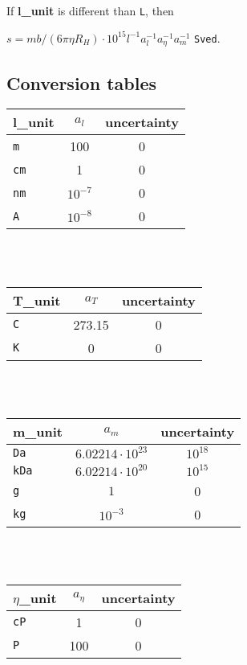 \documentclass[12pt,letterpaper]{article}
\begin{document}
If \textbf{l\_unit} is different than \texttt{L}, then \\
\begin{center}
$s = mb/(6\pi\eta R_H) \cdot 10^{15} l^{-1} a_l^{-1} a_\eta^{-1} a_m^{-1}$ \texttt{Sved}.
\end{center} 

\subsection{Conversion tables}

\begin{tabular}{| l | c | c |}
\hline \textbf{l\_unit} & $a_{l}$ & uncertainty \\
\hline\hline \texttt{m} & 100 & 0 \\
\hline\texttt{cm} & 1 & 0 \\
\hline\texttt{nm} & $10^{-7}$ & 0 \\
\hline\texttt{A} & $10^{-8}$ & 0 \\
\hline
\end{tabular} \\ \\

\noindent \begin{tabular}{| l | c | c |}
\hline \textbf{T\_unit} & $a_{T}$ & uncertainty \\
\hline\hline \texttt{C} & 273.15 & 0 \\
\hline \texttt{K} & 0 & 0 \\
\hline
\end{tabular} \\ \\

\noindent \begin{tabular}{| l | c | c |}
\hline \textbf{m\_unit} & $a_{m}$ & uncertainty \\
\hline\hline \texttt{Da} & $6.02214 \cdot 10^{23}$ & $10^{18}$ \\
\hline \texttt{kDa} & $6.02214 \cdot 10^{20}$ & $10^{15}$ \\
\hline \texttt{g} & $1$ & 0 \\
\hline \texttt{kg} & $10^{-3}$ & 0 \\
\hline
\end{tabular} \\ \\

\noindent \begin{tabular}{| l | c | c |}
\hline $\eta$\textbf{\_unit} & $a_{\eta}$ & uncertainty \\
\hline\hline \texttt{cP} & 1 & 0 \\
\hline \texttt{P} & 100 & 0 \\
\hline
\end{tabular} \\ \\
\end{document}

